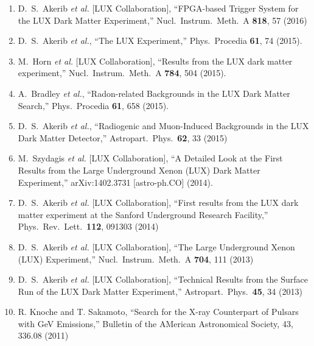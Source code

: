 \documentclass[a4paper,10pt]{article}
\begin{document}
\begin{enumerate}
\item   D.~S.~Akerib {\it et al.} [LUX Collaboration],
  ``FPGA-based Trigger System for the LUX Dark Matter Experiment,''
  Nucl.\ Instrum.\ Meth.\ A {\bf 818}, 57 (2016)
  
\item   D.~S.~Akerib {\it et al.},
  ``The LUX Experiment,''
  Phys.\ Procedia {\bf 61}, 74 (2015).
  
\item M.~Horn {\it et al.} [LUX Collaboration],
  ``Results from the LUX dark matter experiment,''
  Nucl.\ Instrum.\ Meth.\ A {\bf 784}, 504 (2015).
  
\item   A.~Bradley {\it et al.},
  ``Radon-related Backgrounds in the LUX Dark Matter Search,''
  Phys.\ Procedia {\bf 61}, 658 (2015).
  
\item   D.~S.~Akerib {\it et al.},
  ``Radiogenic and Muon-Induced Backgrounds in the LUX Dark Matter Detector,''
  Astropart.\ Phys.\  {\bf 62}, 33 (2015)
  
\item   M.~Szydagis {\it et al.} [LUX Collaboration],
  ``A Detailed Look at the First Results from the Large Underground Xenon (LUX) Dark Matter Experiment,''  arXiv:1402.3731 [astro-ph.CO] (2014).
  
\item   D.~S.~Akerib {\it et al.} [LUX Collaboration],
  ``First results from the LUX dark matter experiment at the Sanford Underground Research Facility,''
  Phys.\ Rev.\ Lett.\  {\bf 112}, 091303 (2014)

\item   D.~S.~Akerib {\it et al.} [LUX Collaboration],
  ``The Large Underground Xenon (LUX) Experiment,''
  Nucl.\ Instrum.\ Meth.\ A {\bf 704}, 111 (2013)
 
\item   D.~S.~Akerib {\it et al.} [LUX Collaboration],
  ``Technical Results from the Surface Run of the LUX Dark Matter Experiment,''
  Astropart.\ Phys.\  {\bf 45}, 34 (2013)
 
\item   R. Knoche and T. Sakamoto,
  ``Search for the X-ray Counterpart of Pulsars with GeV Emissions,''
  Bulletin of the AMerican Astronomical Society, 43, 336.08 (2011)  
   
\end{enumerate}
\end{document}
